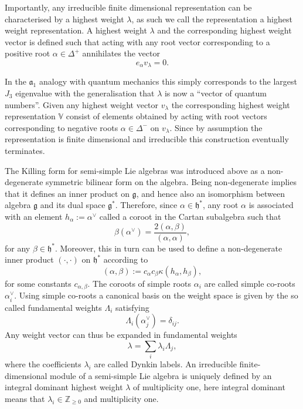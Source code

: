 Importantly, any irreducible finite dimensional representation can be characterised by a highest weight $\lambda$, as such we call the representation a highest weight representation. A highest weight $\lambda$ and the corresponding highest weight vector is defined such that acting with any root vector corresponding to a positive root $\alpha\in\Delta^+$ annihilates the vector
\begin{equation}
    e_\alpha v_\lambda = 0.
\end{equation}

In the $\mathfrak{a}_1$ analogy with quantum mechanics this simply corresponds to the largest $J_3$ eigenvalue with the generalisation that $\lambda$ is now a ``vector of quantum numbers''. Given any highest weight vector $v_\lambda$ the corresponding highest weight representation $\mathbb{V}$ consist of elements obtained by acting with root vectors corresponding to negative roots $\alpha\in\Delta^-$ on $v_\lambda$. Since by assumption the representation is finite dimensional and irreducible this construction eventually terminates.

The Killing form for semi-simple Lie algebras was introduced above as a non-degenerate symmetric bilinear form on the algebra. Being non-degenerate implies that it defines an inner product on $\mathfrak{g}$, and hence also an isomorphism between algebra $\mathfrak{g}$ and its dual space $\mathfrak{g}^*$. Therefore, since $\alpha\in\mathfrak{h}^*$, any root $\alpha$ is associated with an element $h_\alpha:=\alpha^\vee$ called a coroot in the Cartan subalgebra such that 
\begin{equation}\label{eq:CorootsDef}
    \beta(\alpha^\vee) = \frac{2(\alpha,\beta)}{(\alpha,\alpha)},
\end{equation}
for any $\beta\in\mathfrak{h}^*$. Moreover, this in turn can be used to define a non-degenerate inner product $(\cdot,\cdot)$ on $\mathfrak{h}^*$ according to
\begin{equation}
    (\alpha,\beta):= c_\alpha c_\beta \kappa(h_\alpha,h_\beta),
\end{equation}
for some constants $c_{\alpha,\beta}$. The coroots of simple roots $\alpha_{i}$ are called simple co-roots $\alpha_{i}^{\vee}$. Using simple co-roots a canonical basis on the weight space is given by the so called fundamental weights $\Lambda_{i}$ satisfying 
\begin{equation}\label{eq:FundWeights}
    \Lambda_i(\alpha_j^\vee) = \delta_{ij}.
\end{equation}
Any weight vector can thus be expanded in fundamental weights 
\begin{equation}
    \lambda = \sum_i \lambda_i\Lambda_{j},
\end{equation}
where the coefficients $\lambda_i$ are called Dynkin labels. An irreducible finite-dimensional module of a semi-simple Lie algebra is uniquely defined by an integral dominant highest weight $\lambda$ of multiplicity one, here integral dominant means that $\lambda_i\in \mathbb{Z}_{\geq 0}$ and multiplicity one.

